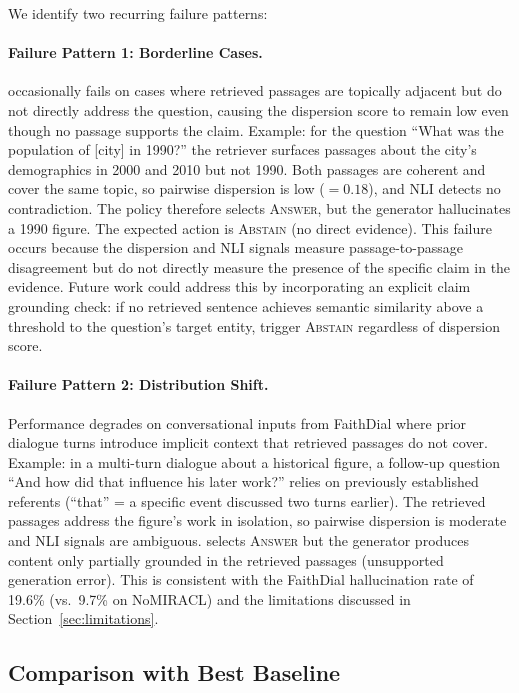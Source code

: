 We identify two recurring failure patterns:

\paragraph{Failure Pattern 1: Borderline Cases.}
\method{} occasionally fails on cases where retrieved passages are topically adjacent but do not directly address the question, causing the dispersion score to remain low even though no passage supports the claim. Example: for the question ``What was the population of [city] in 1990?'' the retriever surfaces passages about the city's demographics in 2000 and 2010 but not 1990. Both passages are coherent and cover the same topic, so pairwise dispersion is low ($= 0.18$), and NLI detects no contradiction. The policy therefore selects \textsc{Answer}, but the generator hallucinates a 1990 figure. The expected action is \textsc{Abstain} (no direct evidence). This failure occurs because the dispersion and NLI signals measure passage-to-passage disagreement but do not directly measure the presence of the specific claim in the evidence. Future work could address this by incorporating an explicit claim grounding check: if no retrieved sentence achieves semantic similarity above a threshold to the question's target entity, trigger \textsc{Abstain} regardless of dispersion score.

\paragraph{Failure Pattern 2: Distribution Shift.}
Performance degrades on conversational inputs from FaithDial where prior dialogue turns introduce implicit context that retrieved passages do not cover. Example: in a multi-turn dialogue about a historical figure, a follow-up question ``And how did that influence his later work?'' relies on previously established referents (``that'' = a specific event discussed two turns earlier). The retrieved passages address the figure's work in isolation, so pairwise dispersion is moderate and NLI signals are ambiguous. \method{} selects \textsc{Answer} but the generator produces content only partially grounded in the retrieved passages (unsupported generation error). This is consistent with the FaithDial hallucination rate of 19.6\% (vs.\ 9.7\% on NoMIRACL) and the limitations discussed in Section~\ref{sec:limitations}.

\subsection{Comparison with Best Baseline}


